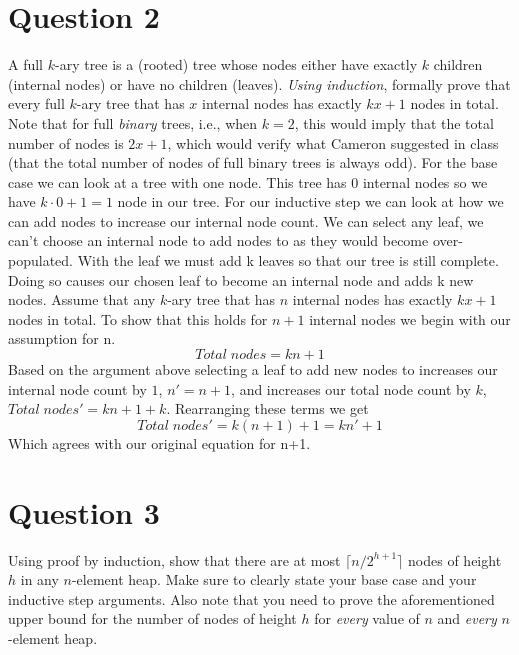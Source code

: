 \documentclass{article}
\begin{document}
\section*{Question 2}
A full $k$-ary tree is a (rooted) tree whose nodes either have exactly $k$ children
(internal nodes) or have no children (leaves). \emph{Using induction}, formally prove that every full
$k$-ary tree that has $x$ internal nodes has exactly $kx+1$ nodes in total. Note that for full
\emph{binary} trees, i.e., when $k=2$, this would imply that the total number of nodes is $2x+1$,
which would verify what Cameron suggested in class (that the total number of nodes of full binary
trees is always odd).
\newline
\newline
\indent For the base case we can look at a tree with one node. This tree has $0$ internal nodes so we have $k\cdot 0 + 1=1$ node in our tree.
For our inductive step we can look at how we can add nodes to increase our internal node count.
We can select any leaf, we can't choose an internal node to add nodes to as they would become over-populated.
With the leaf we must add k leaves so that our tree is still complete.
Doing so causes our chosen leaf to become an internal node and adds k new nodes.
Assume that any $k$-ary tree that has $n$ internal nodes has exactly $kx+1$ nodes in total.
To show that this holds for $n+1$ internal nodes we begin with our assumption for n.
$$Total \; nodes = kn+1$$
Based on the argument above selecting a leaf to add new nodes to increases our internal node count by $1$, $n'=n+1$, and increases our total node count by $k$, $Total \; nodes'=kn+1+k$.
Rearranging these terms we get
$$Total \; nodes' = k(n+1)+1 = kn'+1$$
Which agrees with our original equation for n+1.


\section*{Question 3}
Using proof by induction, show that there are at most $\lceil n/2^{h+1}\rceil$
nodes of height $h$ in any $n$-element heap. Make sure to clearly state your base case and your
inductive step arguments. Also note that you need to prove the aforementioned upper bound for the
number of nodes of height $h$ for \emph{every} value of $n$ and \emph{every} $n$-element heap.
\newline
\newline
\end{document}
